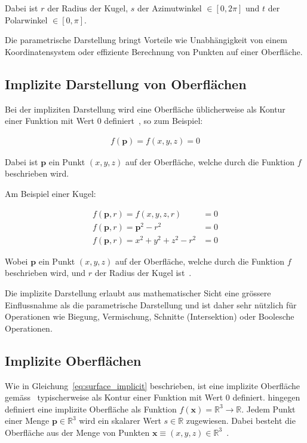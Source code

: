 Dabei ist $r$ der Radius der Kugel, $s$ der Azimutwinkel $\in [0, 2\pi]$ und
$t$ der Polarwinkel $\in [0, \pi]$.

Die parametrische Darstellung bringt Vorteile wie Unabhängigkeit von
einem Koordinatensystem oder effiziente Berechnung von Punkten auf
einer Oberfläche.

\subsection{Implizite Darstellung von Oberflächen}
\label{subsec:surfaces:display:implicit}

Bei der impliziten Darstellung wird eine Oberfläche üblicherweise als Kontur
einer Funktion mit Wert 0 definiert~\parencite[S.
1]{menon_introduction_1996}, so zum Beispiel:

\begin{gather}\label{eq:surface_implicit}
    f(\bm{p}) = f(x, y, z) = 0
\end{gather}

Dabei ist $\bm{p}$ ein Punkt $(x, y, z)$ auf der Oberfläche, welche durch die Funktion
$f$ beschrieben wird.

Am Beispiel einer Kugel:

\begin{align}\label{eq:sphere_implicit}
    f(\bm{p}, r) = f(x, y, z, r) &= 0 \\
    f(\bm{p}, r) = \bm{p}^{2} - r^{2} &= 0 \\
    f(\bm{p}, r) = x^{2} + y^{2} + z^{2} - r^{2} &= 0
\end{align}

Wobei $\bm{p}$ ein Punkt $(x, y, z)$ auf der Oberfläche, welche durch
die Funktion $f$ beschrieben wird, und $r$ der Radius der Kugel
ist~\parencite[S. 91]{glassner_introduction_1989}.

Die implizite Darstellung erlaubt aus mathematischer Sicht eine grössere
Einflussnahme als die parametrische Darstellung und ist daher sehr
nützlich für Operationen wie Biegung, Vermischung, Schnitte
(Intersektion) oder Boolesche Operationen.

\subsection{Implizite Oberflächen}
\label{subsec:implicit_surfaces}

Wie in Gleichung~\ref{eq:surface_implicit} beschrieben, ist eine implizite
Oberfläche gemäss~\citeauthor{menon_introduction_1996} typischerweise als
Kontur einer Funktion mit Wert 0 definiert.
\citeauthor{hart_ray_1993} hingegen definiert eine implizite Oberfläche
als Funktion $ f(\bm{x}) = \mathbb{R}^{3} \to \mathbb{R} $. Jedem
Punkt einer Menge $ \bm{p} \in \mathbb{R}^{3} $ wird ein skalarer
Wert $ s \in \mathbb{R} $ zugewiesen. Dabei besteht die Oberfläche aus
der Menge von Punkten $ \bm{x} \equiv (x, y, z) \in \mathbb{R}^{3}
$~\parencite[S. 527]{hart_sphere_1994}.

